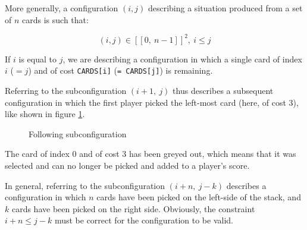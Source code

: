 \documentclass[a4paper,12pt,fleqn]{article}
\begin{document}
More generally, a configuration $(i,j)$ describing a situation produced from a set of $n$ cards is such that:

$$ (i,j) \in [\![0,\ n-1]\!]^2, \ i \leq j $$

If $i$ is equal to $j$, we are describing a configuration in which a single card of index $i$ ($= j$) and of cost \texttt{CARDS[i]} (\texttt{= CARDS[j]}) is remaining.

\medskip

Referring to the subconfiguration $(i+1,\ j)$ thus describes a subsequent configuration in which the first player picked the left-most card (here, of cost 3), like shown in figure \ref{fig:example_diag_02}.

\begin{figure}[H]
    \centering
    \caption{Following subconfiguration}
    \label{fig:example_diag_02}
\end{figure}

The card of index 0 and of cost 3 has been greyed out, which means that it was selected and can no longer be picked and added to a player's score.

\medskip

In general, referring to the subconfiguration $(i+n,\ j-k)$ describes a configuration in which $n$ cards have been picked on the left-side of the stack, and $k$ cards have been picked on the right side. Obviously, the constraint $i+n \leq j-k$ must be correct for the configuration to be valid.
\end{document}
